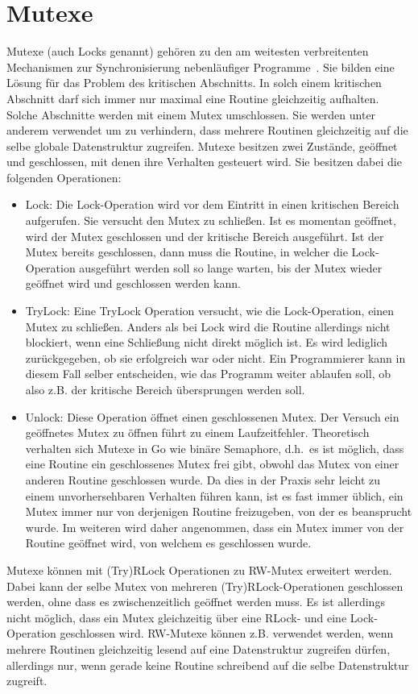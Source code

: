 \section{Mutexe}\label{Chap:Back-Sec:Mutex}
Mutexe (auch Locks genannt) gehören zu den am weitesten verbreitenten Mechanismen 
zur Synchronisierung nebenläufiger Programme~\cite{Undead}. Sie bilden 
eine Lösung für das Problem des kritischen Abschnitts. In solch einem 
kritischen Abschnitt darf sich immer nur maximal eine Routine gleichzeitig
aufhalten. Solche Abschnitte werden mit einem Mutex umschlossen. 
Sie werden unter anderem verwendet um zu verhindern, dass 
mehrere Routinen gleichzeitig auf die selbe globale Datenstruktur 
zugreifen. Mutexe besitzen zwei Zustände, geöffnet und geschlossen, mit denen 
ihre Verhalten gesteuert wird.
Sie besitzen dabei die folgenden Operationen:
\begin{itemize}
  \item Lock: Die Lock-Operation wird vor dem Eintritt in einen kritischen 
    Bereich aufgerufen. Sie versucht den Mutex zu schließen. Ist es momentan 
    geöffnet, wird der Mutex geschlossen und der kritische
    Bereich ausgeführt. Ist der Mutex bereits geschlossen, dann muss 
    die Routine, in welcher die Lock-Operation ausgeführt 
    werden soll so lange warten, bis der Mutex wieder geöffnet wird und 
    geschlossen werden kann.
  \item TryLock: Eine TryLock Operation versucht, wie die Lock-Operation,
    einen Mutex zu schließen. Anders als bei Lock wird die Routine allerdings 
    nicht blockiert, wenn eine Schließung nicht direkt möglich ist. Es wird 
    lediglich zurückgegeben, ob sie erfolgreich war oder nicht. Ein Programmierer 
    kann in diesem Fall selber entscheiden, wie das Programm weiter ablaufen 
    soll, ob also z.B. der kritische Bereich übersprungen werden soll.
  \item Unlock: Diese Operation öffnet einen geschlossenen Mutex. Der Versuch ein 
    geöffnetes Mutex zu öffnen führt zu einem Laufzeitfehler. 
    Theoretisch verhalten sich Mutexe in Go wie binäre Semaphore, d.h.~es ist möglich, 
    dass eine Routine ein 
    geschlossenes Mutex frei gibt, obwohl das Mutex von einer anderen Routine
    geschlossen wurde. Da dies in der Praxis sehr leicht zu einem 
    unvorhersehbaren Verhalten führen kann, ist es fast immer üblich, 
    ein Mutex immer nur von derjenigen Routine freizugeben, von der es beansprucht wurde. 
    Im weiteren wird daher angenommen, 
    dass ein Mutex immer von der Routine geöffnet wird, von welchem es 
    geschlossen wurde.
\end{itemize}
Mutexe können mit (Try)RLock Operationen zu RW-Mutex erweitert werden.
Dabei kann der selbe Mutex von mehreren 
(Try)RLock-Operationen geschlossen werden, ohne dass es zwischenzeitlich
geöffnet werden muss. Es ist allerdings 
nicht möglich, dass ein Mutex gleichzeitig über eine RLock- und eine Lock-Operation 
geschlossen wird. RW-Mutexe können z.B. verwendet werden, wenn mehrere Routinen 
gleichzeitig lesend auf eine Datenstruktur zugreifen dürfen, allerdings nur, 
wenn gerade keine Routine schreibend auf die selbe Datenstruktur zugreift.



